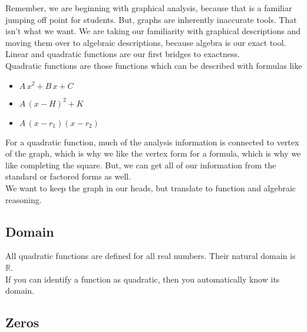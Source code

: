 \documentclass{ximera}
\begin{document}
Remember, we are beginning with graphical analysis, because that is a familiar jumping off point for students.  But, graphs are inherently inaccurate tools.  That isn't what we want. We are taking our familiarity with graphical descriptions and moving them over to algebraic descriptions, because algebra is our exact tool. \\

Linear and quadratic functions are our first bridges to exactness. \\


Quadratic functions are those functions which can be described with formulas like

\begin{itemize}
     \item $A \, x^2 + B \, x + C$
     \item $A \, (x - H)^2 + K$
     \item $A \, (x - r_1) (x-r_2)$
\end{itemize}

For a quadratic function, much of the analysis information is connected to vertex of the graph, which is why we like the vertex form for a formula, which is why we like completing the square.  But, we can get all of our information from the standard or factored forms as well. \\

We want to keep the graph in our heads, but translate to function and algebraic reasoning. \\





\subsection*{Domain} 

All quadratic functions are defined for all real numbers.  Their natural domain is $\mathbb{R}$. \\

If you can identify a function as quadratic, then you automatically know its domain. \\











\subsection*{Zeros}
\end{document}
